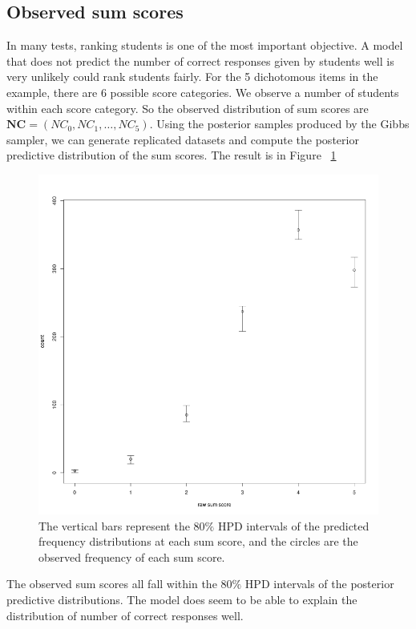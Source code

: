 \documentclass[floatsintext, man]{apa7}
\begin{document}
\subsection{Observed sum scores}
In many tests, ranking students is one of the most important objective. A model
that does not predict the number of correct responses given by students well is
very unlikely could rank students fairly. For the 5 dichotomous items in the
example, there are 6 possible score categories. We observe a number of students
within each score category. So the observed distribution of sum scores are $
\bm{NC}=(NC_0, NC_1, \dots, NC_5)$. Using the posterior samples produced by the
Gibbs sampler, we can generate replicated datasets and compute the posterior
predictive distribution of the sum scores. The result is in Figure~
\ref{fig:ppmc_raw_scores}
\begin{figure}[t]
\centering
  \includegraphics[scale=0.4]{Fig/raw_score_coverage.png}
  \caption{The vertical bars represent the $80\%$ HPD intervals of the predicted
  frequency distributions at each sum score, and the circles are the observed
  frequency of each sum score.}
  \label{fig:ppmc_raw_scores}
\end{figure}
The observed sum scores all fall within the $80\%$ HPD intervals of the posterior
predictive distributions. The model does seem to be able to explain the
distribution of number of correct responses well.
\end{document}
